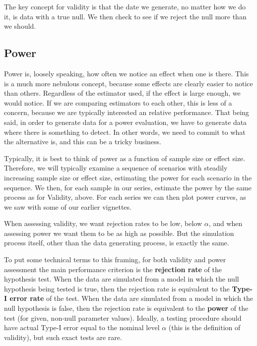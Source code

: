 \documentclass[
]{book}
\begin{document}
The key concept for validity is that the date we generate, no matter how we do it, is data with a true null.
We then check to see if we reject the null more than we should.

\hypertarget{power}{%
\subsection{Power}\label{power}}

Power is, loosely speaking, how often we notice an effect when one is there.
This is a much more nebulous concept, because some effects are clearly easier to notice than others. Regardless of the estimator used, if the effect is large enough, we would notice.
If we are comparing estimators to each other, this is less of a concern, because we are typically interested an relative performance. That being said, in order to generate data for a power evaluation, we have to generate data where there is something to detect.
In other words, we need to commit to what the alternative is, and this can be a tricky business.

Typically, it is best to think of power as a function of sample size or effect size. Therefore, we will typically examine a sequence of scenarios with steadily increasing sample size or effect size, estimating the power for each scenario in the sequence.
We then, for each sample in our series, estimate the power by the same process as for Validity, above.
For each series we can then plot power curves, as we saw with some of our earlier vignettes.

When assessing validity, we want rejection rates to be low, below \(\alpha\), and when assessing power we want them to be as high as possible. But the simulation process itself, other than the data generating process, is exactly the same.

To put some technical terms to this framing, for both validity and power assessment the main performance criterion is the \textbf{rejection rate} of the hypothesis test. When the data are simulated from a model in which the null hypothesis being tested is true, then the rejection rate is equivalent to the \textbf{Type-I error rate} of the test. When the data are simulated from a model in which the null hypothesis is false, then the rejection rate is equivalent to the \textbf{power} of the test (for given, non-null parameter values).
Ideally, a testing procedure should have actual Type-I error equal to the nominal level \(\alpha\) (this is the definition of validity), but such exact tests are rare.
\end{document}
